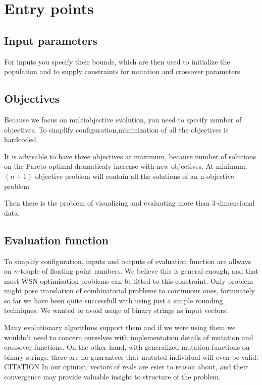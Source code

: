 \documentclass[12pt,oneside]{fithesis2}
\begin{document}
\section{Entry points}

\subsection{Input parameters}
For inputs you specify their bounds, which are then used to initialize the population and to supply constraints for mutation and crossover parameters

\subsection{Objectives}
Because we focus on multiobjective evolution, you need to specify number of objectives. To simplify configuration,minimization of all the objectives is hardcoded.

It is advisable to have three objectives at maximum, because number of solutions on the Pareto optimal dramaticaly increase with new objectives.
At minimum, $(n+1)$ objective problem will contain all the solutions of an n-objective problem. \cite{talbi2009metaheuristics}

Then there is the problem of visualizing and evaluating more than 3-dimensional data.

\subsection{Evaluation function}

To simplify configuration, inputs and outputs of evaluation function are allways an $n$-touple of floating point numbers. We believe this is general enough, and that most WSN optimisation problems can be fitted to this constraint. Only problem might pose translation of combinatorial problems to continuous ones, fortunately so far we have been quite successfull with using just a simple rounding techniques. We wanted to avoid usage of binary strings as input vectors.

Many evolutionary algorithms support them and if we were using them we wouldn't need to concern ourselves with implementation details of mutation and crossover functions. On the other hand, with generalized mutation functions on binary strings, there are no guarantees that mutated individual will even be valid. CITATION In our opinion, vectors of reals are esier to reason about, and their convergence may provide valuable insight to structure of the problem.
\end{document}
